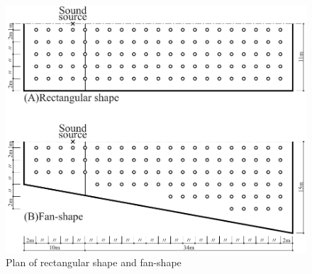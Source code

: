 \begin{figure}[H]
    \centering
    \includegraphics[keepaspectratio,scale=0.99]{02_att/rec_fan_zumen_2.pdf}
    \caption{\hspace{1mm}Plan of rectangular shape and fan-shape}
    \label{fig:(A)矩形モデル及び(B)扇形モデル平面図}
\end{figure}

\clearpage
